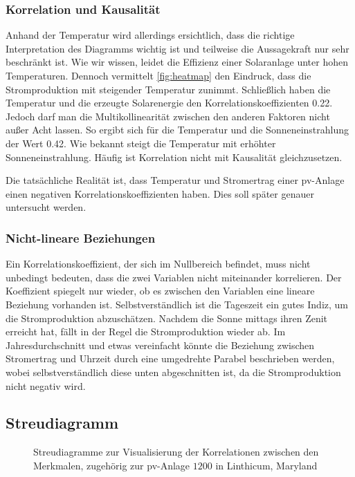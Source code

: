 \documentclass[12pt, a4paper]{article}
\begin{document}
\subsubsection{Korrelation und Kausalität}

Anhand der Temperatur wird allerdings ersichtlich, dass die richtige Interpretation des Diagramms wichtig ist und teilweise die Aussagekraft nur sehr beschränkt ist. Wie wir wissen, leidet die Effizienz einer Solaranlage unter hohen Temperaturen. Dennoch vermittelt \autoref{fig:heatmap} den Eindruck, dass die Stromproduktion mit steigender Temperatur zunimmt. Schließlich haben die Temperatur und die erzeugte Solarenergie den Korrelationskoeffizienten 0.22. Jedoch darf man die Multikollinearität zwischen den anderen Faktoren nicht außer Acht lassen. So ergibt sich für die Temperatur und die Sonneneinstrahlung der Wert 0.42. Wie bekannt steigt die Temperatur mit erhöhter Sonneneinstrahlung. Häufig ist Korrelation nicht mit Kausalität gleichzusetzen.

Die tatsächliche Realität ist, dass Temperatur und Stromertrag einer \ac{pv}-Anlage einen negativen Korrelationskoeffizienten haben. Dies soll später genauer untersucht werden.

\subsubsection{Nicht-lineare Beziehungen}

Ein Korrelationskoeffizient, der sich im Nullbereich befindet, muss nicht unbedingt bedeuten, dass die zwei Variablen nicht miteinander korrelieren. Der Koeffizient spiegelt nur wieder, ob es zwischen den Variablen eine lineare Beziehung vorhanden ist. Selbstverständlich ist die Tageszeit ein gutes Indiz, um die Stromproduktion abzuschätzen. Nachdem die Sonne mittags ihren Zenit erreicht hat, fällt in der Regel die Stromproduktion wieder ab. Im Jahresdurchschnitt und etwas vereinfacht könnte die Beziehung zwischen Stromertrag und Uhrzeit durch eine umgedrehte Parabel beschrieben werden, wobei selbstverständlich diese unten abgeschnitten ist, da die Stromproduktion nicht negativ wird.

\subsection{Streudiagramm}

\begin{figure}
\centering
\def\svgwidth{450pt}

\caption{Streudiagramme zur Visualisierung der Korrelationen zwischen den Merkmalen, zugehörig zur \ac{pv}-Anlage $1200$ in Linthicum, Maryland}
\label{fig:pairplot_all}
\end {figure}
\end{document}
